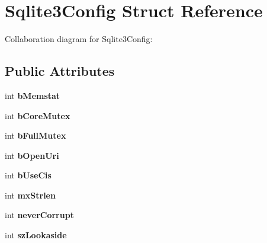\hypertarget{structSqlite3Config}{}\section{Sqlite3\+Config Struct Reference}
\label{structSqlite3Config}


Collaboration diagram for Sqlite3\+Config\+:
\subsection*{Public Attributes}
\begin{DoxyCompactItemize}
\item 
int {\bfseries b\+Memstat}\hypertarget{structSqlite3Config_aae01de5f37a66422f2a7413e108e03fe}{}\label{structSqlite3Config_aae01de5f37a66422f2a7413e108e03fe}

\item 
int {\bfseries b\+Core\+Mutex}\hypertarget{structSqlite3Config_a202216a82e0823d0a4629c4884215a54}{}\label{structSqlite3Config_a202216a82e0823d0a4629c4884215a54}

\item 
int {\bfseries b\+Full\+Mutex}\hypertarget{structSqlite3Config_aab880bf54370cd0f6210afce0fb646ee}{}\label{structSqlite3Config_aab880bf54370cd0f6210afce0fb646ee}

\item 
int {\bfseries b\+Open\+Uri}\hypertarget{structSqlite3Config_af446c9f0657e5564b4dbba3421ffc8be}{}\label{structSqlite3Config_af446c9f0657e5564b4dbba3421ffc8be}

\item 
int {\bfseries b\+Use\+Cis}\hypertarget{structSqlite3Config_a3eb3eb5fe14358aba2a6e0083f29d807}{}\label{structSqlite3Config_a3eb3eb5fe14358aba2a6e0083f29d807}

\item 
int {\bfseries mx\+Strlen}\hypertarget{structSqlite3Config_a66f1f85ec9b7724f7fe0bebad61a634f}{}\label{structSqlite3Config_a66f1f85ec9b7724f7fe0bebad61a634f}

\item 
int {\bfseries never\+Corrupt}\hypertarget{structSqlite3Config_a6dc51cea630491a7c0694c1547894f1f}{}\label{structSqlite3Config_a6dc51cea630491a7c0694c1547894f1f}

\item 
int {\bfseries sz\+Lookaside}\hypertarget{structSqlite3Config_ad7504c4c1867db9837b40d7c22ba7582}{}\label{structSqlite3Config_ad7504c4c1867db9837b40d7c22ba7582}


\end{DoxyCompactItemize}
